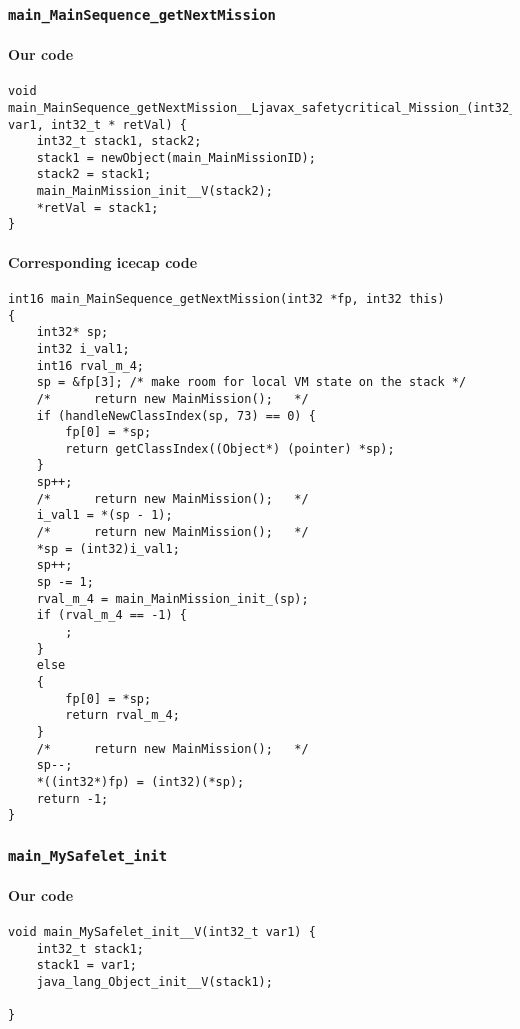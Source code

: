 \subsubsection{\texttt{main\_MainSequence\_getNextMission}}

\paragraph{Our code}\hfill
\begin{lstlisting}[firstnumber=1869]
void main_MainSequence_getNextMission__Ljavax_safetycritical_Mission_(int32_t var1, int32_t * retVal) {
	int32_t stack1, stack2;
	stack1 = newObject(main_MainMissionID);
	stack2 = stack1;
	main_MainMission_init__V(stack2);
	*retVal = stack1;
}
\end{lstlisting}

\paragraph{Corresponding icecap code}\hfill
\begin{lstlisting}[firstnumber=54342]
int16 main_MainSequence_getNextMission(int32 *fp, int32 this)
{
	int32* sp;
	int32 i_val1;
	int16 rval_m_4;
	sp = &fp[3]; /* make room for local VM state on the stack */
	/*		return new MainMission();   */
	if (handleNewClassIndex(sp, 73) == 0) {
		fp[0] = *sp;
		return getClassIndex((Object*) (pointer) *sp);
	}
	sp++;
	/*		return new MainMission();   */
	i_val1 = *(sp - 1);
	/*		return new MainMission();   */
	*sp = (int32)i_val1;
	sp++;
	sp -= 1;
	rval_m_4 = main_MainMission_init_(sp);
	if (rval_m_4 == -1) {
		;
	}
	else
	{
		fp[0] = *sp;
		return rval_m_4;
	}
	/*		return new MainMission();   */
	sp--;
	*((int32*)fp) = (int32)(*sp);
	return -1;
}
\end{lstlisting}

\subsubsection{\texttt{main\_MySafelet\_init}}

\paragraph{Our code}\hfill
\begin{lstlisting}[firstnumber=1970]
void main_MySafelet_init__V(int32_t var1) {
	int32_t stack1;
	stack1 = var1;
	java_lang_Object_init__V(stack1);

}
\end{lstlisting}

